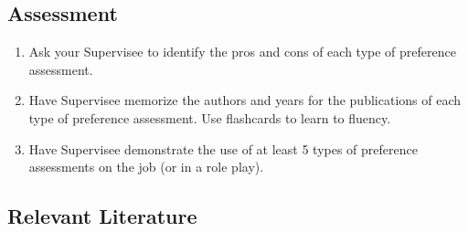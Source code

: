 \subsection{Assessment}
\begin{enumerate}
\item Ask your Supervisee to identify the pros and cons of each type of preference assessment.
\item Have Supervisee memorize the authors and years for the publications of each type of preference assessment. Use flashcards to learn to fluency.
\item Have Supervisee demonstrate the use of at least 5 types of preference assessments on the job (or in a role play).
\end{enumerate}
%
\subsection{Relevant Literature}
\begin{refsection}
\nocite{test,alang2017police,clayton2018black}
\printbibliography[heading=none]
\end{refsection}
%
